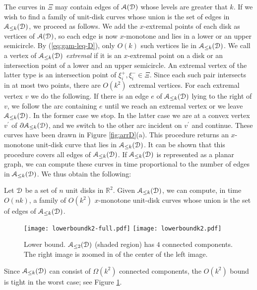 \documentclass[11pt]{myclass}
\renewcommand{\b}[1]{\ensuremath{\mathbb{#1}}}
\newcommand{\EuD}{\ensuremath{\EuScript{D}}}
\newcommand{\EuA}{\ensuremath{\EuScript{A}}}
\begin{document}
The curves in $\Xi$ may contain edges of $\EuA(\EuD)$ whose levels are greater that $k$.  If we wish to find a family of unit-disk curves whose union is the set of edges in $\EuA_{\leq k}(\EuD)$, we proceed as follows.  
We add the $x$-extremal points of each disk as vertices of $\EuA(\EuD)$, so each edge is now $x$-monotone and lies in a lower or an upper semicircle.  By (\ref{eq:gam-leq-D}), only $O(k)$ such vertices lie in $\EuA_{\leq k}(\EuD)$.  
We call a vertex of $\EuA_{\leq k}(\EuD)$ \emph{extremal} if it is an $x$-extremal point on a disk or an intersection point of a lower and an upper semicircle.  An extremal vertex of the latter type is an intersection point of $\xi_i^+, \xi_i^- \in \Xi$.  Since each such pair intersects in at most two points, there are $O(k^2)$ extremal vertices.  
For each extremal vertex $v$ we do the following.  If there is an edge $e$ of $\EuA_{\leq k}(\EuD)$ lying to the right of $v$, we follow the arc containing $e$ until we reach an extremal vertex or we leave $\EuA_{\leq k}(\EuD)$.  In the former case we stop.  In the latter 
case we are at a convex vertex $v^\prime$ of $\partial \EuA_{\leq k}(\EuD)$, and we switch to the other arc incident on $v^\prime$ and continue.  These curves have been drawn in Figure \ref{fig:arrD}(a).  This procedure returns an $x$-monotone unit-disk curve that lies in $\EuA_{\leq k}(\EuD)$.  It can be shown that this procedure covers all edges of $\EuA_{\leq k}(\EuD)$.  
If $\EuA_{\leq k}(\EuD)$ is represented as a planar graph, we can compute these curves in time proportional to the number of edges in $\EuA_{\leq k}(\EuD)$.  
We thus obtain the following:

\begin{lemma}
Let $\EuD$ be a set of $n$ unit disks in $\b{R}^2$.  Given $\EuA_{\leq k}(\EuD)$, we can compute, in time $O(nk)$, a family of $O(k^2)$ $x$-monotone unit-disk curves whose union is the set of edges of $\EuA_{\leq k}(\EuD)$.  
\label{lem:udcs-k2}
\end{lemma}


\begin{figure}
  \centering 
  \texttt{[image: lowerboundk2-full.pdf]}
  \hspace{.5in}
  \texttt{[image: lowerboundk2.pdf]}
\caption{\label{fig:lb-k2} 
Lower bound.  $\EuA_{\leq 2}(\EuD)$ (shaded region) has $4$ connected components.  The right image is zoomed in of the center of the left image.}
\end{figure}

\begin{remark}
Since $\EuA_{\leq k}(\EuD)$ can consist of $\Omega(k^2)$ connected components, the $O(k^2)$ bound is tight in the worst case; see Figure \ref{fig:lb-k2}.
\end{remark}
\end{document}
